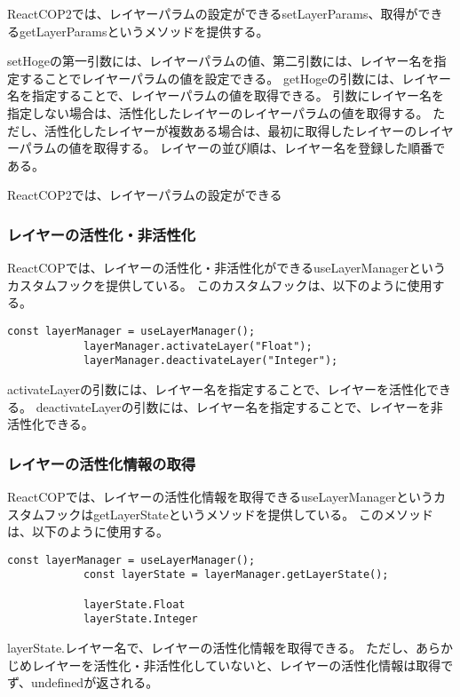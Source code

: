 \documentclass{jsarticle}
\begin{document}

        ReactCOP2では、レイヤーパラムの設定ができるsetLayerParams、取得ができるgetLayerParamsというメソッドを提供する。

        setHogeの第一引数には、レイヤーパラムの値、第二引数には、レイヤー名を指定することでレイヤーパラムの値を設定できる。
        getHogeの引数には、レイヤー名を指定することで、レイヤーパラムの値を取得できる。
        引数にレイヤー名を指定しない場合は、活性化したレイヤーのレイヤーパラムの値を取得する。
        ただし、活性化したレイヤーが複数ある場合は、最初に取得したレイヤーのレイヤーパラムの値を取得する。
        レイヤーの並び順は、レイヤー名を登録した順番である。

        ReactCOP2では、レイヤーパラムの設定ができる
    \subsubsection{レイヤーの活性化・非活性化}
        ReactCOPでは、レイヤーの活性化・非活性化ができるuseLayerManagerというカスタムフックを提供している。
        このカスタムフックは、以下のように使用する。
        \begin{lstlisting}[]
            const layerManager = useLayerManager();
            layerManager.activateLayer("Float");
            layerManager.deactivateLayer("Integer");
        \end{lstlisting}
        activateLayerの引数には、レイヤー名を指定することで、レイヤーを活性化できる。
        deactivateLayerの引数には、レイヤー名を指定することで、レイヤーを非活性化できる。

    \subsubsection{レイヤーの活性化情報の取得}
        ReactCOPでは、レイヤーの活性化情報を取得できるuseLayerManagerというカスタムフックはgetLayerStateというメソッドを提供している。
        このメソッドは、以下のように使用する。
        \begin{lstlisting}[]
            const layerManager = useLayerManager();
            const layerState = layerManager.getLayerState();

            layerState.Float
            layerState.Integer
        \end{lstlisting}
        layerState.{レイヤー名}で、レイヤーの活性化情報を取得できる。
        ただし、あらかじめレイヤーを活性化・非活性化していないと、レイヤーの活性化情報は取得でず、undefinedが返される。
\end{document}
